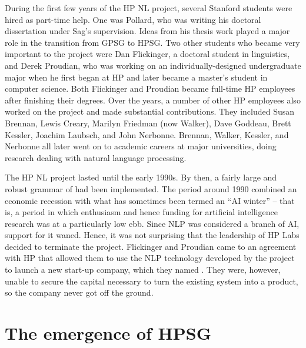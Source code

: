 \documentclass[output=paper,biblatex,babelshorthands,newtxmath,draftmode,colorlinks,citecolor=brown]{langscibook}
\begin{document}
During the first few years of the HP NL project, several Stanford students were hired as part-time
help.  One was Pollard, who was writing his doctoral dissertation under Sag's supervision.  Ideas
from his thesis work played a major role in the transition from GPSG to HPSG.  Two other students
who became very important to the project were Dan Flickinger, a doctoral
student in linguistics, and Derek Proudian, who was working on an
individually-designed undergraduate major when he first began at HP and later became a master's
student in computer science.  Both Flickinger and Proudian became full-time HP employees after
finishing their degrees.  Over the years, a number of other HP employees also worked on the project
and made substantial contributions.  They included Susan Brennan, Lewis
Creary, Marilyn Friedman (now
Walker), Dave Goddeau, Brett
Kessler, Joachim Laubsch, and John
Nerbonne.  Brennan, Walker, Kessler, and Nerbonne all later went on to
academic careers at major universities, doing research dealing with natural language processing.

The HP NL project lasted until the early 1990s.  By then, a fairly large and robust grammar of
 had been implemented.  The period around 1990 combined an economic recession with what
has sometimes been termed an ``AI winter'' -- that is, a period in which enthusiasm and hence
funding for artificial intelligence research was at a particularly low ebb.  Since NLP was
considered a branch of AI, support for it waned.  Hence, it was not surprising that the leadership
of HP Labs decided to terminate the project.  Flickinger and Proudian came to an agreement with HP
that allowed them to use the NLP technology developed by the project to launch a new start-up
company, which they named .  They were, however, unable to secure the capital
necessary to turn the existing system into a product, so the company never got off the ground.

\section{The emergence of HPSG}
\end{document}
